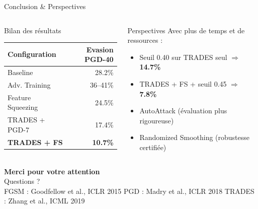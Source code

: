 \documentclass[aspectratio=169,11pt]{beamer}
\begin{document}
\begin{frame}{Conclusion \& Perspectives}
\begin{columns}[T]
\begin{block}{Bilan des r\'esultats}
\footnotesize
\begin{tabular}{lr}
\toprule
\textbf{Configuration} & \textbf{Evasion PGD-40} \\
\midrule
Baseline               & 28.2\% \\
Adv. Training          & \alert{36--41\%} \\
Feature Squeezing      & 24.5\% \\
TRADES + PGD-7         & 17.4\% \\
\rowcolor{inptblue!30}
\textbf{TRADES + FS}   & \textbf{10.7\%} \\
\bottomrule
\end{tabular}
\end{block}

\begin{exampleblock}{Perspectives}
Avec plus de temps et de ressources :
\begin{itemize}\setlength\itemsep{3pt}
    \item Seuil 0.40 sur TRADES seul $\Rightarrow$ \textbf{14.7\%}
    \item TRADES + FS + seuil 0.45 $\Rightarrow$ \textbf{7.8\%}
    \item AutoAttack (\'evaluation plus rigoureuse)
    \item Randomized Smoothing (robustesse certifi\'ee)
\end{itemize}
\end{exampleblock}
\end{columns}
\end{frame}

\begin{frame}[plain]
\begin{center}
\vspace{2.5cm}
{\LARGE\bfseries\color{white} Merci pour votre attention}\\[0.8em]
{\large\color{inptcyan} Questions ?}\\[2em]
{\footnotesize\color{white!80}
FGSM : Goodfellow et al., ICLR 2015 \quad
PGD : Madry et al., ICLR 2018 \quad
TRADES : Zhang et al., ICML 2019}
\end{center}
\end{frame}
\end{document}
